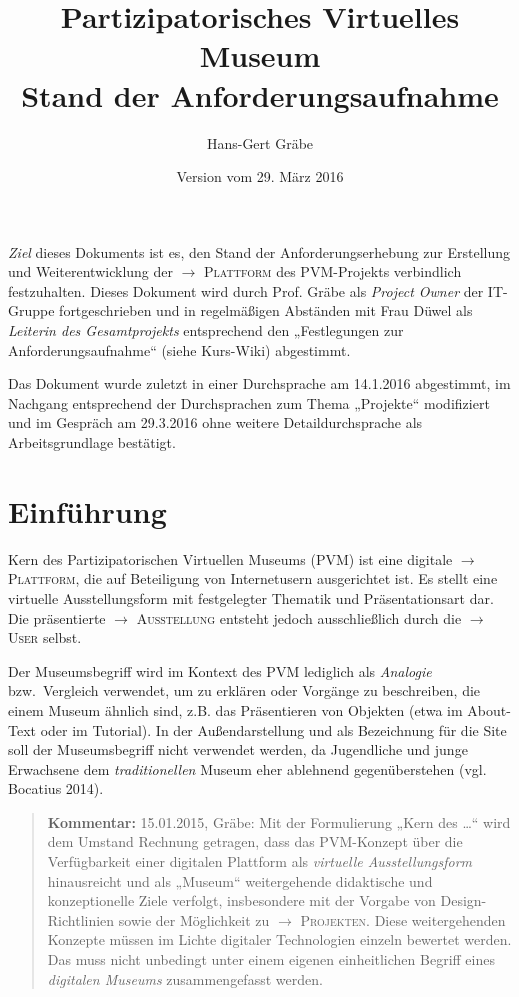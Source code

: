 \documentclass[a4paper,11pt]{article}
\title{Partizipatorisches Virtuelles Museum\\[.6em] 
  Stand der Anforderungsaufnahme}
\date{Version vom 29. März 2016}
\author{Hans-Gert Gräbe}
\newcommand{\Kommentar}[1]{
  \begin{quote}\textbf{Kommentar:} #1 \end{quote}
}
\newcommand{\glossar}[1]{{$\to$ \textsc{#1}}}
\begin{document}
\maketitle

\tableofcontents

\newpage  

\emph{Ziel} dieses Dokuments ist es, den Stand der Anforderungserhebung zur
Erstellung und Weiterentwicklung der \glossar{Plattform} des PVM-Projekts
verbindlich festzuhalten.  Dieses Dokument wird durch Prof. Gräbe als
\emph{Project Owner} der IT-Gruppe fortgeschrieben und in regelmäßigen
Abständen mit Frau Düwel als \emph{Leiterin des Gesamtprojekts} entsprechend
den „Festlegungen zur Anforderungsaufnahme“ (siehe Kurs-Wiki) abgestimmt.

Das Dokument wurde zuletzt in einer Durchsprache am 14.1.2016 abgestimmt, im
Nachgang entsprechend der Durchsprachen zum Thema „Projekte“ modifiziert und
im Gespräch am 29.3.2016 ohne weitere Detaildurchsprache als Arbeitsgrundlage
bestätigt.

\section{Einführung}

Kern des Partizipatorischen Virtuellen Museums (PVM) ist eine digitale
\glossar{Plattform}, die auf Beteiligung von Internetusern ausgerichtet ist. Es
stellt eine virtuelle Ausstellungsform mit festgelegter Thematik und
Präsentationsart dar.  Die präsentierte \glossar{Ausstellung} entsteht jedoch
ausschließlich durch die \glossar{User} selbst.

Der Museumsbegriff wird im Kontext des PVM lediglich als \emph{Analogie}
bzw.\ Vergleich verwendet, um zu erklären oder Vorgänge zu beschreiben, die
einem Museum ähnlich sind, z.B. das Präsentieren von Objekten (etwa im
About-Text oder im Tutorial).  In der Außendarstellung und als Bezeichnung für
die Site soll der Museumsbegriff nicht verwendet werden, da Jugendliche und
junge Erwachsene dem \emph{traditionellen} Museum eher ablehnend
gegenüberstehen (vgl. Bocatius 2014).

\Kommentar{15.01.2015, Gräbe: Mit der Formulierung „Kern des \ldots“ wird dem
  Umstand Rechnung getragen, dass das PVM-Konzept über die Verfügbarkeit einer
  digitalen Plattform als \emph{virtuelle Ausstellungsform} hinausreicht und
  als „Museum“ weitergehende didaktische und konzeptionelle Ziele verfolgt,
  insbesondere mit der Vorgabe von Design-Richtlinien sowie der Möglichkeit zu
  \glossar{Projekten}. Diese weitergehenden Konzepte müssen im Lichte digitaler
  Technologien einzeln bewertet werden.  Das muss nicht unbedingt unter einem
  eigenen einheitlichen Begriff eines \emph{digitalen Museums} zusammengefasst
  werden. }
\end{document}
